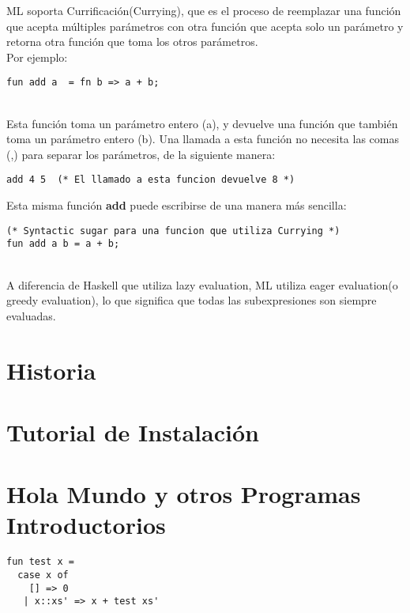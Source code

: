 \documentclass[11pt]{article} %
\begin{document}
ML soporta Currificación(Currying), que es el proceso de reemplazar una función que acepta múltiples parámetros con otra función que acepta solo un parámetro y retorna otra función que toma los otros parámetros.\\
Por ejemplo:\\
\begin{lstlisting}[frame=single]
fun add a  = fn b => a + b;
\end{lstlisting}\\

Esta función toma un parámetro entero (a), y devuelve una función que también toma un parámetro entero (b). Una llamada a esta función no necesita las comas (,) para separar los parámetros, de la siguiente manera:\\

\begin{lstlisting}[frame=single]
add 4 5  (* El llamado a esta funcion devuelve 8 *) 
\end{lstlisting}

Esta misma función {\bf add} puede escribirse de una manera más sencilla:\\

\begin{lstlisting}[frame=single]
(* Syntactic sugar para una funcion que utiliza Currying *)
fun add a b = a + b;
\end{lstlisting}\\

A diferencia de Haskell que utiliza lazy evaluation, ML utiliza eager evaluation(o greedy evaluation), lo que significa que todas las subexpresiones son siempre evaluadas.

\section{\color{red}Historia}
\section{\color{red}Tutorial de Instalación}
\section{\color{red}Hola Mundo y otros Programas Introductorios}

\lstset{language=ML}          %

\begin{lstlisting}[frame=single]  % Start your code-block
fun test x =
  case x of
    [] => 0
   | x::xs' => x + test xs'
\end{lstlisting}
\end{document}
